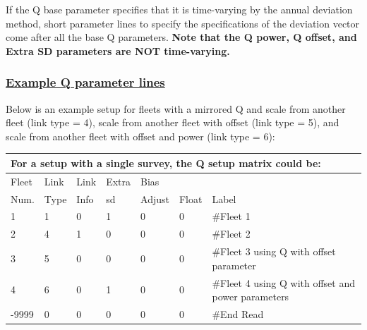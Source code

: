 If the Q base parameter specifies that it is time-varying by the annual deviation method, short parameter lines to specify the specifications of the deviation vector come after all the base Q parameters. \textbf{Note that the Q power, Q offset, and Extra SD parameters are NOT time-varying.}

\hypertarget{QParams}{}
\subsubsection[Example Q parameter lines]{\protect\hyperlink{QParams}{Example Q parameter lines}}
Below is an example setup for fleets with a mirrored Q and scale from another fleet (link type = 4), scale from another fleet with offset (link type = 5), and scale from another fleet with offset and power (link type = 6):
\begin{longtable}{p{1cm} p{1cm} p{1cm} p{1cm} p{1cm} p{1cm} p{7.6cm}}
	\multicolumn{7}{l}{For a setup with a single survey, the Q setup matrix could be:} \\
	\hline
	Fleet \Tstrut & Link & Link & Extra    & Bias   & & \\
	Num.          & Type & Info & \gls{sd} & Adjust & Float & Label \Bstrut\\
	\hline
	1 & 1 & 0 & 1 & 0 & 0 & \#Fleet 1 \Tstrut\\
	2 & 4 & 1 & 0 & 0 & 0 & \#Fleet 2 \\
	3 & 5 & 0 & 0 & 0 & 0 & \#Fleet 3 using Q with offset parameter \\
    4 & 6 & 0 & 1 & 0 & 0 & \#Fleet 4 using Q with offset and power parameters \\
	-9999 & 0 & 0 & 0 & 0 & 0 & \#End Read \Bstrut\\
	\hline
\end{longtable}


